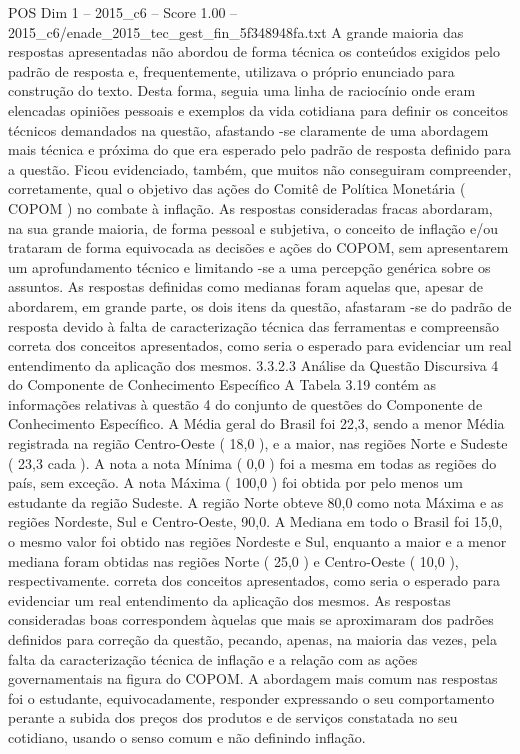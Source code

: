 \begin{textsample}{POS Dim 1 – 2015\_c6 – Score 1.00 – 2015\_c6/enade\_2015\_tec\_gest\_fin\_5f348948fa.txt}
A grande maioria das respostas apresentadas não abordou de forma técnica os conteúdos exigidos pelo padrão de resposta e, frequentemente, utilizava o próprio enunciado para construção do texto.
Desta forma, seguia uma linha de raciocínio onde eram elencadas opiniões pessoais e exemplos da vida cotidiana para definir os conceitos técnicos demandados na questão, afastando -se claramente de uma abordagem mais técnica e próxima do que era esperado pelo padrão de resposta definido para a questão.
Ficou evidenciado, também, que muitos não conseguiram compreender, corretamente, qual o objetivo das ações do Comitê de Política Monetária ( COPOM ) no combate à inflação.
As respostas consideradas fracas abordaram, na sua grande maioria, de forma pessoal e subjetiva, o conceito de inflação e/ou trataram de forma equivocada as decisões e ações do COPOM, sem apresentarem um aprofundamento técnico e limitando -se a uma percepção genérica sobre os assuntos.
As respostas definidas como medianas foram aquelas que, apesar de abordarem, em grande parte, os dois itens da questão, afastaram -se do padrão de resposta devido à falta de caracterização técnica das ferramentas e compreensão correta dos conceitos apresentados, como seria o esperado para evidenciar um real entendimento da aplicação dos mesmos. 3.3.2.3 Análise da Questão Discursiva 4 do Componente de Conhecimento Específico A Tabela 3.19 contém as informações relativas à questão 4 do conjunto de questões do Componente de Conhecimento Específico.
A Média geral do Brasil foi 22,3, sendo a menor Média registrada na região Centro-Oeste ( 18,0 ), e a maior, nas regiões Norte e Sudeste ( 23,3 cada ).
A nota a nota Mínima ( 0,0 ) foi a mesma em todas as regiões do país, sem exceção.
A nota Máxima ( 100,0 ) foi obtida por pelo menos um estudante da região Sudeste.
A região Norte obteve 80,0 como nota Máxima e as regiões Nordeste, Sul e Centro-Oeste, 90,0.
A Mediana em todo o Brasil foi 15,0, o mesmo valor foi obtido nas regiões Nordeste e Sul, enquanto a maior e a menor mediana foram obtidas nas regiões Norte ( 25,0 ) e Centro-Oeste ( 10,0 ), respectivamente. correta dos conceitos apresentados, como seria o esperado para evidenciar um real entendimento da aplicação dos mesmos.
As respostas consideradas boas correspondem àquelas que mais se aproximaram dos padrões definidos para correção da questão, pecando, apenas, na maioria das vezes, pela falta da caracterização técnica de inflação e a relação com as ações governamentais na figura do COPOM.
A abordagem mais comum nas respostas foi o estudante, equivocadamente, responder expressando o seu comportamento perante a subida dos preços dos produtos e de serviços constatada no seu cotidiano, usando o senso comum e não definindo inflação.

\end{textsample}
